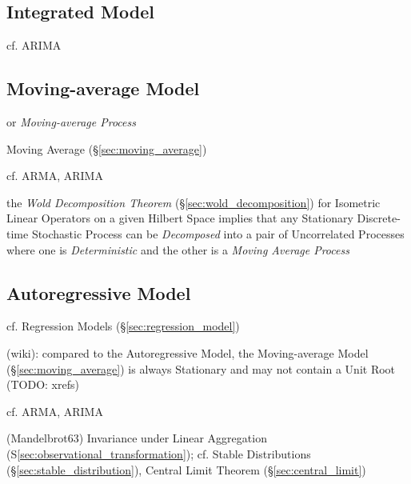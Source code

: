 \subsection{Integrated Model}\label{sec:integrated_model}

cf. ARIMA



\subsection{Moving-average Model}\label{sec:moving_average_model}

or \emph{Moving-average Process}

Moving Average (\S\ref{sec:moving_average})

cf. ARMA, ARIMA

the \emph{Wold Decomposition Theorem} (\S\ref{sec:wold_decomposition}) for
Isometric Linear Operators on a given Hilbert Space implies that any Stationary
Discrete-time Stochastic Process can be \emph{Decomposed} into a pair of
Uncorrelated Processes where one is \emph{Deterministic} and the other is a
\emph{Moving Average Process}



\subsection{Autoregressive Model}\label{sec:autoregressive_model}

cf. Regression Models (\S\ref{sec:regression_model})

(wiki): compared to the Autoregressive Model, the Moving-average Model
(\S\ref{sec:moving_average}) is always Stationary and may not contain a Unit
Root (TODO: xrefs)

cf. ARMA, ARIMA

(Mandelbrot63) Invariance under Linear Aggregation
(S\ref{sec:observational_transformation}); cf. Stable Distributions
(\S\ref{sec:stable_distribution}), Central Limit Theorem
(\S\ref{sec:central_limit})


